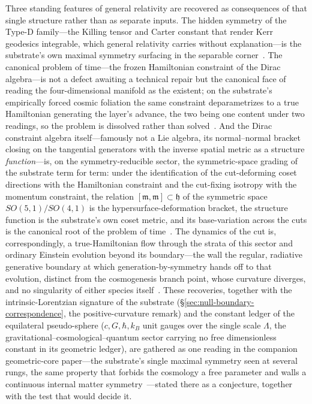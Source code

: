 \documentclass[11pt,a4paper]{article}
\theoremstyle{plain}
\theoremstyle{definition}
\theoremstyle{remark}
\begin{document}
Three standing features of general relativity are recovered as consequences of that single structure rather than as separate inputs. The hidden symmetry of the Type-D family---the Killing tensor and Carter constant that render Kerr geodesics integrable, which general relativity carries without explanation---is the substrate's own maximal symmetry surfacing in the separable corner~\cite{JanzenRange}. The canonical problem of time---the frozen Hamiltonian constraint of the Dirac algebra---is not a defect awaiting a technical repair but the canonical face of reading the four-dimensional manifold as the existent; on the substrate's empirically forced cosmic foliation the same constraint deparametrizes to a true Hamiltonian generating the layer's advance, the two being one content under two readings, so the problem is dissolved rather than solved~\cite{JanzenCanonicalTime}. And the Dirac constraint algebra itself---famously not a Lie algebra, its normal--normal bracket closing on the tangential generators with the inverse spatial metric as a structure \emph{function}---is, on the symmetry-reducible sector, the symmetric-space grading of the substrate term for term: under the identification of the cut-deforming coset directions with the Hamiltonian constraint and the cut-fixing isotropy with the momentum constraint, the relation $[\mathfrak{m},\mathfrak{m}]\subset\mathfrak{h}$ of the symmetric space $SO(5,1)/SO(4,1)$ is the hypersurface-deformation bracket, the structure function is the substrate's own coset metric, and its base-variation across the cuts is the canonical root of the problem of time~\cite{JanzenAlgebroid}. The dynamics of the cut is, correspondingly, a true-Hamiltonian flow through the strata of this sector and ordinary Einstein evolution beyond its boundary---the wall the regular, radiative generative boundary at which generation-by-symmetry hands off to that evolution, distinct from the cosmogenesis branch point, whose curvature diverges, and no singularity of either species itself~\cite{JanzenDynamics}. These recoveries, together with the intrinsic-Lorentzian signature of the substrate (\S\ref{sec:null-boundary-correspondence}, the positive-curvature remark) and the constant ledger of the equilateral pseudo-sphere ($c,G,\hbar,k_B$ unit gauges over the single scale $\Lambda$, the gravitational--cosmological--quantum sector carrying no free dimensionless constant in its geometric ledger), are gathered as one reading in the companion geometric-core paper---the substrate's single maximal symmetry seen at several rungs, the same property that forbids the cosmology a free parameter and walls a continuous internal matter symmetry~\cite{JanzenGeometricCore}---stated there as a conjecture, together with the test that would decide it.
\end{document}
